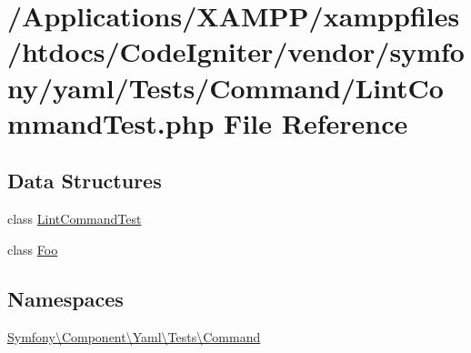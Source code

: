 \hypertarget{_lint_command_test_8php}{}\section{/\+Applications/\+X\+A\+M\+P\+P/xamppfiles/htdocs/\+Code\+Igniter/vendor/symfony/yaml/\+Tests/\+Command/\+Lint\+Command\+Test.php File Reference}
\label{_lint_command_test_8php}
\subsection*{Data Structures}
\begin{DoxyCompactItemize}
\item 
class \mbox{\hyperlink{class_symfony_1_1_component_1_1_yaml_1_1_tests_1_1_command_1_1_lint_command_test}{Lint\+Command\+Test}}
\item 
class \mbox{\hyperlink{class_symfony_1_1_component_1_1_yaml_1_1_tests_1_1_command_1_1_foo}{Foo}}
\end{DoxyCompactItemize}
\subsection*{Namespaces}
\begin{DoxyCompactItemize}
\item 
 \mbox{\hyperlink{namespace_symfony_1_1_component_1_1_yaml_1_1_tests_1_1_command}{Symfony\textbackslash{}\+Component\textbackslash{}\+Yaml\textbackslash{}\+Tests\textbackslash{}\+Command}}
\end{DoxyCompactItemize}
